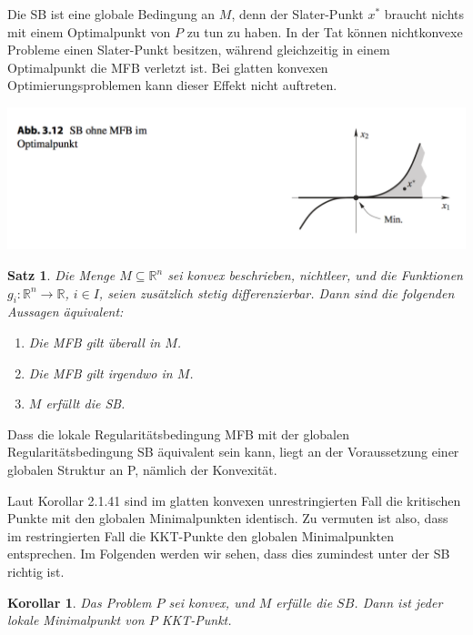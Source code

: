 \documentclass[11pt]{scrreprt}
\newcounter{thm}
\theoremstyle{thmstyle}
\numberwithin{thm}{section}
\newtheorem{korollar}[thm]{Korollar}
\newtheorem{satz}[thm]{Satz}
\begin{document}
Die SB ist eine globale Bedingung an $M$, denn der Slater-Punkt $x^*$ braucht nichts mit einem Optimalpunkt von $P$ zu tun zu haben. In der Tat können nichtkonvexe Probleme einen Slater-Punkt besitzen, während gleichzeitig in einem Optimalpunkt die MFB verletzt ist. Bei glatten konvexen Optimierungsproblemen kann dieser Effekt nicht auftreten.

\begin{center}
	\includegraphics[scale=0.5]{img/ab312}
\end{center}

\begin{satz}
	Die Menge $M \subseteq \mathbb{R}^n$ sei konvex beschrieben, nichtleer, und die Funktionen $g_i \colon \mathbb{R}^n \rightarrow \mathbb{R}$, $i \in I$, seien zusätzlich stetig differenzierbar. Dann sind die folgenden Aussagen äquivalent:
	\begin{enumerate}[label=\alph*\upshape)]
		\item Die MFB gilt überall in $M$.
		\item Die MFB gilt irgendwo in $M$.
		\item $M$ erfüllt die SB.
	\end{enumerate}
\end{satz}

Dass die lokale Regularitätsbedingung MFB mit der globalen Regularitätsbedingung SB äquivalent sein kann, liegt an der Voraussetzung einer globalen Struktur an P, nämlich der Konvexität. ~\bigskip

Laut Korollar 2.1.41 sind im glatten konvexen unrestringierten Fall die kritischen Punkte mit den globalen Minimalpunkten identisch. Zu vermuten ist also, dass im restringierten Fall die KKT-Punkte den globalen Minimalpunkten entsprechen. Im Folgenden werden wir sehen, dass dies zumindest unter der SB richtig ist.

\begin{korollar}
	Das Problem $P$ sei konvex, und $M$ erfülle die $SB$. Dann ist jeder lokale Minimalpunkt von $P$ KKT-Punkt.
\end{korollar}
\end{document}
